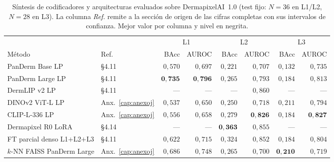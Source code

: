 \begin{table}[H]
\centering
\footnotesize
\setlength{\tabcolsep}{4pt}
\renewcommand{\arraystretch}{0.95}
\caption{Síntesis de codificadores y arquitecturas evaluados sobre
DermapixelAI~1.0 (test fijo: $N = 36$ en L1/L2, $N = 28$ en L3).
La columna \emph{Ref.} remite a la sección de origen de las cifras
completas con sus intervalos de confianza. Mejor valor por columna
y nivel en negrita.}
\label{tab:dermapixel-extra-sintesis}
\begin{tabular}{llrrrrrr}
\hline
                                  &     & \multicolumn{2}{c}{L1} & \multicolumn{2}{c}{L2} & \multicolumn{2}{c}{L3} \\
Método                            & Ref.& BAcc & AUROC           & BAcc & AUROC           & BAcc & AUROC \\
\hline
PanDerm Base LP                   & §4.11 & $0{,}570$          & $0{,}697$
                                          & $0{,}221$          & $0{,}707$
                                          & $0{,}132$          & $0{,}735$ \\
PanDerm Large LP                  & §4.11 & $\mathbf{0{,}735}$ & $\mathbf{0{,}796}$
                                          & $0{,}265$          & $0{,}793$
                                          & $0{,}184$          & $0{,}813$ \\
DermLIP v2 LP                     & §4.11 & ---                & ---
                                          & ---                & $0{,}860$
                                          & ---                & --- \\
DINOv2 ViT-L LP                   & Anx.~\ref{cap:anexoj} & $0{,}537$          & $0{,}650$
                                          & $0{,}250$          & $0{,}718$
                                          & $0{,}211$          & $0{,}794$ \\
CLIP-L-336 LP                     & Anx.~\ref{cap:anexoj} & $0{,}556$          & $0{,}658$
                                          & $0{,}279$          & $\mathbf{0{,}826}$
                                          & $0{,}184$          & $\mathbf{0{,}827}$ \\
Dermapixel R0 LoRA                & §4.14 & ---                & ---
                                          & $\mathbf{0{,}363}$ & $0{,}855$
                                          & ---                & --- \\
FT parcial denso L1$+$L2$+$L3      & §4.11 & $0{,}622$          & $0{,}715$
                                          & $0{,}324$          & $0{,}852$
                                          & $0{,}184$          & $0{,}804$ \\
$k$-NN FAISS PanDerm Large         & Anx.~\ref{cap:anexoj} & $0{,}686$          & $0{,}748$
                                          & $0{,}265$          & $0{,}700$
                                          & $\mathbf{0{,}210}$ & $0{,}719$ \\
\hline
\end{tabular}
\end{table}

